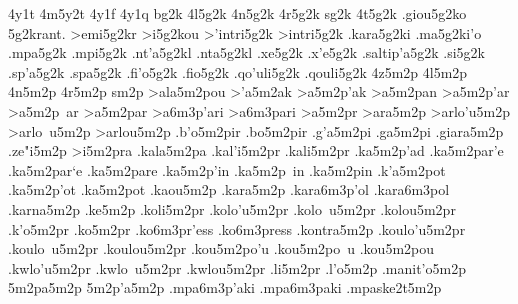 {4y1t
4m5y2t %
4y1f
4y1q
bg2k
4l5g2k
4n5g2k
4r5g2k
sg2k
4t5g2k
.giou5g2ko   %
5g2krant.    %
>emi5g2kr    %
>i5g2kou     %
>'intri5g2k  %
>intri5g2k
.kara5g2ki   %
.ma5g2ki'o   %
.mpa5g2k     %
.mpi5g2k     %
.nt'a5g2kl   %
.nta5g2kl    %
.xe5g2k      %
.x'e5g2k
.saltip'a5g2k %
.si5g2k      %
.sp'a5g2k    %
.spa5g2k
.fi'o5g2k    %
.fio5g2k
.qo'uli5g2k  %
.qouli5g2k
4z5m2p
4l5m2p
4n5m2p
4r5m2p
sm2p
>ala5m2pou   %
>'a5m2ak     %
>a5m2p'ak
>a5m2pan     %
>a5m2p'ar    %
>a5m2p~ar
>a5m2par
  >a6m3p'ari   %
  >a6m3pari
>a5m2pr      %
>ara5m2p     %
>arlo'u5m2p  %
>arlo~u5m2p
>arlou5m2p
.b'o5m2pir   %
.bo5m2pir    %
.g'a5m2pi    %
.ga5m2pi
.giara5m2p 		%
.ze"i5m2p    %
>i5m2pra     %
.kala5m2pa   %
.kal'i5m2pr  %
.kali5m2pr  
.ka5m2p'ad   %
.ka5m2par'e  %
.ka5m2par`e
.ka5m2pare
.ka5m2p'in   %
.ka5m2p~in
.ka5m2pin
.k'a5m2pot   %
.ka5m2p'ot
.ka5m2pot
.kaou5m2p    %
.kara5m2p    %
  .kara6m3p'ol %
  .kara6m3pol
.karna5m2p   %
.ke5m2p      %
.koli5m2pr   %
.kolo'u5m2pr %
.kolo~u5m2pr
.kolou5m2pr
.k'o5m2pr    %
.ko5m2pr
  .ko6m3pr'ess %
  .ko6m3press
.kontra5m2p  %
.koulo'u5m2pr %
.koulo~u5m2pr
.koulou5m2pr
.kou5m2po'u  %
.kou5m2po~u
.kou5m2pou
.kwlo'u5m2pr %
.kwlo~u5m2pr
.kwlou5m2pr
.li5m2pr     %
.l'o5m2p     %
.manit'o5m2p %
5m2pa5m2p    %
5m2p'a5m2p   %
  .mpa6m3p'aki %
  .mpa6m3paki
.mpaske2t5m2p  %
}
